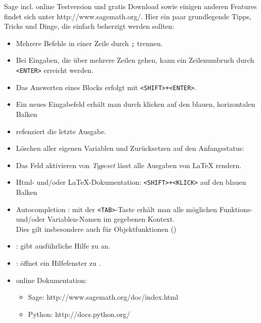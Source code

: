 \documentclass[fontsize=12pt,paper=a4,twoside,bibtotoc,idxtotoc,
liststotoc,pagesize,BCOR1.2cm,DIV15,chapterprefix,pagesize=pdftex]{scrbook}
\begin{document}
Sage incl. online Testversion und gratis Download sowie einigen anderen Features findet sich unter http://www.sagemath.org/.\newline
Hier ein paar grundlegende Tipps, Tricks und Dinge, die einfach beherzigt werden sollten:\newline
\begin{itemize}
 \item Mehrere Befehle in einer Zeile durch {\color{blue} \verb~;~} trennen. 
 \item Bei Eingaben, die über mehrere Zeilen gehen, kann ein
  Zeilenumbruch durch {\color{blue} \verb~<ENTER>~} erreicht werden.
 \item Das Auswerten eines Blocks erfolgt mit {\color{blue} \verb~<SHIFT>+<ENTER>~}.
 \item Ein neues Eingabefeld erhält man durch klicken auf den blauen, horizontalen Balken
 \item {\color{blue} \isage{_} } refenziert die letzte Ausgabe.
 \item Löschen aller eigenen Variablen und Zurücksetzen auf den Anfangsstatus: {\color{blue} }
 \item Das Feld aktivieren von \emph{Typeset} lässt alle Ausgaben von \LaTeX{} rendern.
 \item Html- und/oder \LaTeX-Dokumentation:{\color{blue} \verb~<SHIFT>+<KLICK>~ }auf den blauen Balken
 \item {\color{blue} Autocompletion :} mit der {\color{blue} \verb~<TAB>~}-Taste erhält man alle möglichen Funktions- und/oder Variablen-Namen im gegebenen Kontext.\\
  Dies gilt insbesondere auch für Objektfunktionen ()
 \item {\color{blue}  :} gibt ausführliche Hilfe zu  an.
 \item {\color{blue}  :} öffnet ein Hilfefenster zu .
 \item online Dokumentation:
  \begin{itemize}
   \item Sage: http://www.sagemath.org/doc/index.html
   \item Python: http://docs.python.org/
  \end{itemize}
\end{itemize}
\newpage
\end{document}
